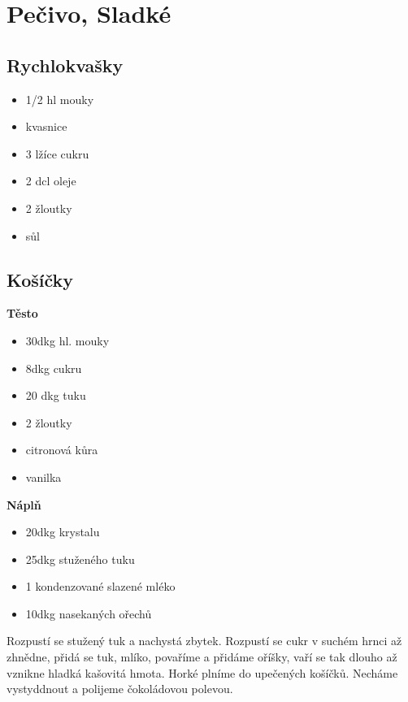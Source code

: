 \documentclass[10pt,a4paper]{article}
\newenvironment{myitemize}
{ \begin{itemize}
    \setlength{\itemsep}{0pt}
    \setlength{\parskip}{0pt}
    \setlength{\parsep}{0pt}     }
{ \end{itemize}                  }
\begin{document}
\section{Pečivo, Sladké}
\subsection{Rychlokvašky}
\begin{minipage}[t]{0,5\textwidth}
\begin{myitemize} 
\item  1/2 hl mouky
\item kvasnice
\item 3 lžíce cukru
\item 2 dcl oleje
\item 2 žloutky
\item sůl
\end{myitemize}
\end{minipage}
\begin{minipage}[t]{0,5\textwidth}

\end{minipage}
\subsection{Košíčky}
\begin{minipage}[t]{0,5\textwidth}
\textbf{Těsto}
\begin{myitemize} 
\item 30dkg hl. mouky
\item 8dkg cukru
\item 20 dkg tuku
\item 2 žloutky
\item citronová kůra
\item vanilka
\end{myitemize}

\end{minipage}
\begin{minipage}[t]{0,5\textwidth}
\textbf{Náplň}
\begin{myitemize} 
\item 20dkg krystalu
\item 25dkg stuženého tuku
\item 1 kondenzované slazené mléko
\item 10dkg  nasekaných ořechů
\end{myitemize}
Rozpustí se stužený tuk a nachystá zbytek.
Rozpustí se cukr v suchém hrnci až zhnědne, přidá se tuk, mlíko, povaříme a přidáme oříšky, vaří se tak dlouho až vznikne hladká kašovitá hmota. Horké plníme do upečených košíčků. Necháme vystyddnout a polijeme čokoládovou polevou.
\end{minipage}
\end{document}
